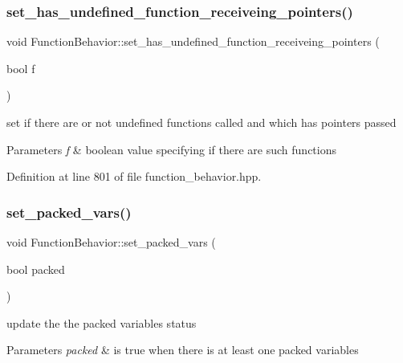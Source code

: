 \subsubsection{\texorpdfstring{set\+\_\+has\+\_\+undefined\+\_\+function\+\_\+receiveing\+\_\+pointers()}{set\_has\_undefined\_function\_receiveing\_pointers()}}
{\footnotesize\ttfamily void Function\+Behavior\+::set\+\_\+has\+\_\+undefined\+\_\+function\+\_\+receiveing\+\_\+pointers (\begin{DoxyParamCaption}\item[{bool}]{f }\end{DoxyParamCaption})\hspace{0.3cm}{\ttfamily [inline]}}



set if there are or not undefined functions called and which has pointers passed 


\begin{DoxyParams}{Parameters}
{\em f} & boolean value specifying if there are such functions \\
\hline
\end{DoxyParams}


Definition at line 801 of file function\+\_\+behavior.\+hpp.

\mbox{\label{classFunctionBehavior_afc93676836d8024377b01148ab16700d}} 
\subsubsection{\texorpdfstring{set\+\_\+packed\+\_\+vars()}{set\_packed\_vars()}}
{\footnotesize\ttfamily void Function\+Behavior\+::set\+\_\+packed\+\_\+vars (\begin{DoxyParamCaption}\item[{bool}]{packed }\end{DoxyParamCaption})\hspace{0.3cm}{\ttfamily [inline]}}



update the the packed variables status 


\begin{DoxyParams}{Parameters}
{\em packed} & is true when there is at least one packed variables \\
\hline
\end{DoxyParams}


